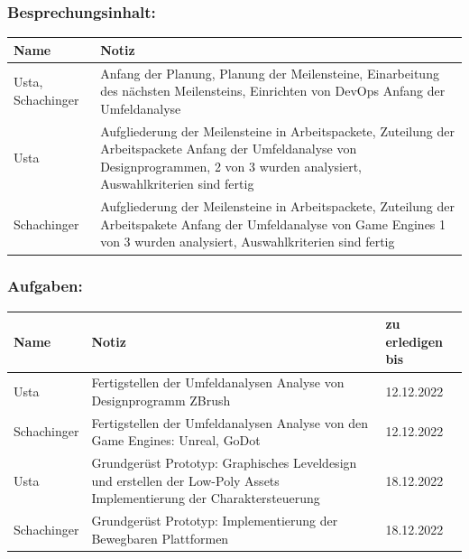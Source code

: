 \subsubsection*{Besprechungsinhalt:}
\begin{tabular}{|m{}|m{}|}
\hline
Name & Notiz \\
\hline
Usta, Schachinger & Anfang der Planung, Planung der Meilensteine, Einarbeitung des nächsten Meilensteins, Einrichten von DevOps Anfang der Umfeldanalyse \\
\hline
Usta & Aufgliederung der Meilensteine in Arbeitspackete,
Zuteilung der Arbeitspackete
Anfang der Umfeldanalyse von Designprogrammen,
2 von 3 wurden analysiert, Auswahlkriterien sind fertig\\
\hline
Schachinger & Aufgliederung der Meilensteine in Arbeitspackete, 
Zuteilung der Arbeitspakete
Anfang der Umfeldanalyse von Game Engines
1 von 3 wurden analysiert, Auswahlkriterien sind fertig\\
\hline
\end{tabular}

\subsubsection*{Aufgaben:}
\begin{tabular}{|m{}|m{}|m{}|}
\hline
Name & Notiz & zu erledigen bis \\
\hline
Usta & Fertigstellen der Umfeldanalysen 
Analyse von Designprogramm ZBrush & 12.12.2022 \\
\hline
Schachinger & Fertigstellen der Umfeldanalysen
Analyse von den Game Engines: Unreal, GoDot & 12.12.2022 \\
\hline
Usta & Grundgerüst Prototyp: 
Graphisches Leveldesign und erstellen der Low-Poly Assets
Implementierung der Charaktersteuerung & 18.12.2022 \\
\hline
Schachinger & Grundgerüst Prototyp: 
Implementierung der Bewegbaren Plattformen & 18.12.2022 \\
\hline
\end{tabular}


\pagebreak

